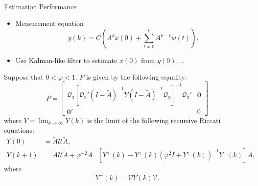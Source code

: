 \documentclass[10pt]{beamer}
\newcommand{\tA}{\tilde A}
\DeclareMathOperator{\1}{\textbf{1}}
\begin{document}
	  \begin{frame}{Estimation Performance}
	    \begin{itemize}
	      \item Measurement equation
	    \begin{displaymath}
	      y(k) =C\left( A^k x(0) + \sum_{t=0}^k A^{k-t}w(t)\right).
	    \end{displaymath}
	  \item Use Kalman-like filter to estimate $x(0)$ from $y(0),\ldots$
	    \end{itemize}
	    \begin{theorem}
	      Suppose that $0<\varphi<1$. $P$ is given by the following equality:
	      \begin{displaymath}
		P =\begin{bmatrix}
		  \mathcal Q_2\left[\mathcal Q_2'(I-\tA)^{-1}Y(I-\tA)^{-1}\mathcal Q_2\right]^{-1} \mathcal Q_2'&\mathbf 0\\
		  \mathbf 0'&0
		\end{bmatrix}
	      \end{displaymath}
	      where $ Y = \lim_{k\rightarrow\infty} Y(k)$ is the limit of the following recursive Riccati equations:
	      \begin{align*}
		Y(0)& = \tA \mathcal U \tA,\\
		Y(k+1) &=\tA \mathcal U\tA  +\varphi^{-2}\tA&\left[ Y^+(k) -  Y^+(k)\left(\varphi^2 I+Y^+(k) \right)^{-1}Y^+(k)\right]\tA,
	      \end{align*}
	      where
	      \begin{displaymath}
		Y^+(k) = \mathcal V Y(k) \mathcal V.
	      \end{displaymath}
	    \end{theorem}
	  \end{frame}
\end{document}
